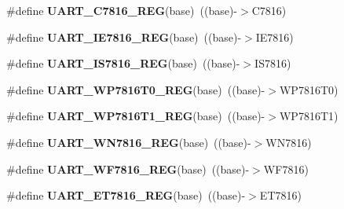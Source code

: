 \begin{DoxyCompactItemize}
\item 
\#define {\bfseries U\+A\+R\+T\+\_\+\+C7816\+\_\+\+R\+EG}(base)~((base)-\/$>$C7816)\hypertarget{group__UART__Register__Accessor__Macros_ga62b94b094e8460ec332a7949fcd3fcbe}{}\label{group__UART__Register__Accessor__Macros_ga62b94b094e8460ec332a7949fcd3fcbe}

\item 
\#define {\bfseries U\+A\+R\+T\+\_\+\+I\+E7816\+\_\+\+R\+EG}(base)~((base)-\/$>$I\+E7816)\hypertarget{group__UART__Register__Accessor__Macros_ga8e43b652c9487967ee9a68a6647bc0bc}{}\label{group__UART__Register__Accessor__Macros_ga8e43b652c9487967ee9a68a6647bc0bc}

\item 
\#define {\bfseries U\+A\+R\+T\+\_\+\+I\+S7816\+\_\+\+R\+EG}(base)~((base)-\/$>$I\+S7816)\hypertarget{group__UART__Register__Accessor__Macros_ga884824f5edc47220e140143df9e5f055}{}\label{group__UART__Register__Accessor__Macros_ga884824f5edc47220e140143df9e5f055}

\item 
\#define {\bfseries U\+A\+R\+T\+\_\+\+W\+P7816\+T0\+\_\+\+R\+EG}(base)~((base)-\/$>$W\+P7816\+T0)\hypertarget{group__UART__Register__Accessor__Macros_ga97ce4d3dc0212a912c19407409bf7c86}{}\label{group__UART__Register__Accessor__Macros_ga97ce4d3dc0212a912c19407409bf7c86}

\item 
\#define {\bfseries U\+A\+R\+T\+\_\+\+W\+P7816\+T1\+\_\+\+R\+EG}(base)~((base)-\/$>$W\+P7816\+T1)\hypertarget{group__UART__Register__Accessor__Macros_ga2347fc1eb0a78f54ad7832c3bf294be0}{}\label{group__UART__Register__Accessor__Macros_ga2347fc1eb0a78f54ad7832c3bf294be0}

\item 
\#define {\bfseries U\+A\+R\+T\+\_\+\+W\+N7816\+\_\+\+R\+EG}(base)~((base)-\/$>$W\+N7816)\hypertarget{group__UART__Register__Accessor__Macros_gabd67cec72a6d396f76a90cdbc3a3da41}{}\label{group__UART__Register__Accessor__Macros_gabd67cec72a6d396f76a90cdbc3a3da41}

\item 
\#define {\bfseries U\+A\+R\+T\+\_\+\+W\+F7816\+\_\+\+R\+EG}(base)~((base)-\/$>$W\+F7816)\hypertarget{group__UART__Register__Accessor__Macros_gaf842f91d9419613faa85e85569a7bf0d}{}\label{group__UART__Register__Accessor__Macros_gaf842f91d9419613faa85e85569a7bf0d}

\item 
\#define {\bfseries U\+A\+R\+T\+\_\+\+E\+T7816\+\_\+\+R\+EG}(base)~((base)-\/$>$E\+T7816)\hypertarget{group__UART__Register__Accessor__Macros_gaefdf97fb53ef91d91e7eba96bc455ba9}{}\label{group__UART__Register__Accessor__Macros_gaefdf97fb53ef91d91e7eba96bc455ba9}


\end{DoxyCompactItemize}
